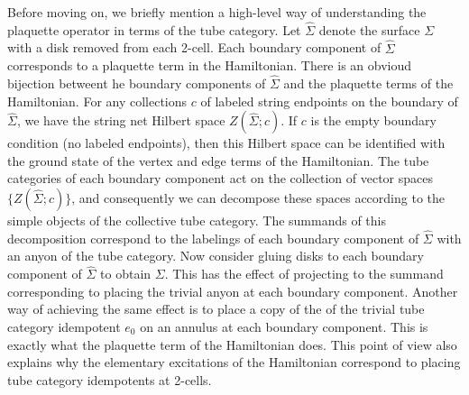 Before moving on, we briefly mention a 
high-level way of understanding the plaquette operator in terms of the tube category.
Let $\widehat\Sigma$ denote the surface $\Sigma$ with a disk removed from each 2-cell.
Each boundary component of $\widehat\Sigma$ corresponds to a plaquette term in the Hamiltonian. 
There is an obvioud bijection betweent he boundary components of $\widehat\Sigma$ and the plaquette terms of the Hamiltonian.
For any collections $c$ of labeled string endpoints on the boundary of $\widehat\Sigma$, we have
the string net Hilbert space $Z(\widehat\Sigma; c)$.
If $c$ is the empty boundary condition (no labeled endpoints), then this Hilbert space can be identified with
the ground state of the vertex and edge terms of the Hamiltonian.
The tube categories of each boundary component act on the collection of vector spaces $\{Z(\widehat\Sigma; c)\}$,
and consequently we can decompose these spaces according to the simple objects of the collective tube category.
The summands of this decomposition correspond to the labelings of each boundary component of $\widehat\Sigma$ with an
anyon of the tube category.
Now consider gluing disks to each boundary component of $\widehat\Sigma$ to obtain $\Sigma$.
This has the effect of projecting to the summand corresponding to placing the trivial anyon at each boundary component.
Another way of achieving the same effect is to place a copy of the of the trivial tube category idempotent $e_0$
on an annulus at each boundary component.
This is exactly what the plaquette term of the Hamiltonian does.
This point of view also explains why the elementary excitations of the Hamiltonian
correspond to placing tube category idempotents at 2-cells.


